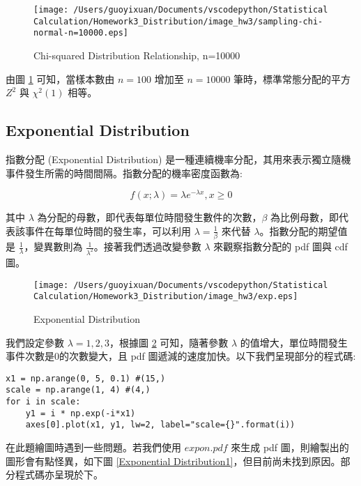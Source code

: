 \begin{figure}[H]
    \centering
        \texttt{[image: /Users/guoyixuan/Documents/vscodepython/Statistical Calculation/Homework3\_Distribution/image\_hw3/sampling-chi-normal-n=10000.eps]}
    \caption{Chi-squared Distribution Relationship, n=10000}
    \label{Chi-squared Distribution Relationship, n=10000}
\end{figure}

由圖 \ref{Chi-squared Distribution Relationship, n=10000} 可知，當樣本數由 $n=100$ 增加至 $n=10000$ 筆時，標準常態分配的平方 $Z^2$ 與 $\chi^2(1)$ 相等。

\subsection{Exponential Distribution}

指數分配 (Exponential Distribution) 是一種連續機率分配，其用來表示獨立隨機事件發生所需的時間間隔。指數分配的機率密度函數為:

\begin{equation}
f(x;\lambda)=\lambda e^{-\lambda x}, x \geq 0
\end{equation}

其中 $\lambda$ 為分配的母數，即代表每單位時間發生數件的次數，$\beta$ 為比例母數，即代表該事件在每單位時間的發生率，可以利用 $\lambda=\frac{1}{\beta}$ 來代替 $\lambda$。指數分配的期望值是 $\frac{1}{\lambda}$，變異數則為 $\frac{1}{\lambda^2}$。接著我們透過改變參數 $\lambda$ 來觀察指數分配的 pdf 圖與 cdf 圖。

\begin{figure}[H]
    \centering
        \texttt{[image: /Users/guoyixuan/Documents/vscodepython/Statistical Calculation/Homework3\_Distribution/image\_hw3/exp.eps]}
    \caption{Exponential Distribution}
    \label{Exponential Distribution}
\end{figure}

我們設定參數 $\lambda=1, 2, 3$，根據圖 \ref{Exponential Distribution} 可知，隨著參數 $\lambda$ 的值增大，單位時間發生事件次數是0的次數變大，且 pdf 圖遞減的速度加快。以下我們呈現部分的程式碼:

\bigskip
\begin{lstlisting}
x1 = np.arange(0, 5, 0.1) #(15,)
scale = np.arange(1, 4) #(4,)
for i in scale:
    y1 = i * np.exp(-i*x1)
    axes[0].plot(x1, y1, lw=2, label="scale={}".format(i))
\end{lstlisting}

在此題繪圖時遇到一些問題。若我們使用 $expon.pdf$ 來生成 pdf 圖，則繪製出的圖形會有點怪異，如下圖 \ref{Exponential Distribution1}，但目前尚未找到原因。部分程式碼亦呈現於下。

